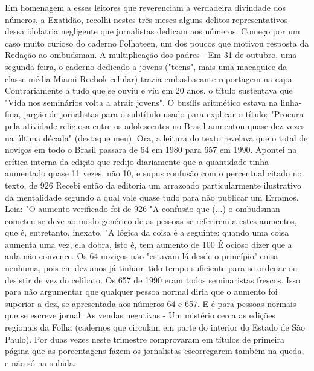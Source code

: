 Em homenagem a esses leitores que reverenciam a verdadeira divindade dos números, a Exatidão, recolhi nestes três meses alguns delitos representativos dessa idolatria negligente que jornalistas dedicam aos números. Começo por um caso muito curioso do caderno Folhateen, um dos poucos que motivou resposta da Redação ao ombudsman.
A multiplicação dos padres - Em 31 de outubro, uma segunda-feira, o caderno dedicado a jovens ("teens", mais uma macaquice da classe média Miami-Reebok-celular) trazia embasbacante reportagem na capa. Contrariamente a tudo que se ouviu e viu em 20 anos, o título sustentava que "Vida nos seminários volta a atrair jovens".
O busílis aritmético estava na linha-fina, jargão de jornalistas para o subtítulo usado para explicar o título: "Procura pela atividade religiosa entre os adolescentes no Brasil aumentou quase dez vezes na última década" (destaque meu).
Ora, a leitura do texto revelava que o total de noviços em todo o Brasil passara de 64 em 1980 para 657 em 1990. Apontei na crítica interna da edição que redijo diariamente que a quantidade tinha aumentado quase 11 vezes, não 10, e supus confusão com o percentual citado no texto, de 926%
Recebi então da editoria um arrazoado particularmente ilustrativo da mentalidade segundo a qual vale quase tudo para não publicar um Erramos. Leia:
"O aumento verificado foi de 926%
"A confusão que (...) o ombudsman cometeu se deve ao modo genérico de as pessoas se referirem a estes aumentos, que é, entretanto, inexato.
"A lógica da coisa é a seguinte: quando uma coisa aumenta uma vez, ela dobra, isto é, tem aumento de 100%
É ocioso dizer que a aula não convence. Os 64 noviços não "estavam lá desde o princípio" coisa nenhuma, pois em dez anos já tinham tido tempo suficiente para se ordenar ou desistir de vez do celibato. Os 657 de 1990 eram todos seminaristas frescos.
Isso para não argumentar que qualquer pessoa normal diria que o aumento foi superior a dez, se apresentada aos números 64 e 657. E é para pessoas normais que se escreve jornal.
As vendas negativas - Um mistério cerca as edições regionais da Folha (cadernos que circulam em parte do interior do Estado de São Paulo). Por duas vezes neste trimestre comprovaram em títulos de primeira página que as porcentagens fazem os jornalistas escorregarem também na queda, e não só na subida.

